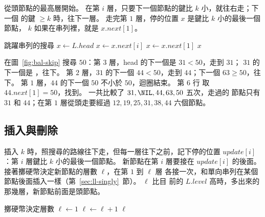 從頭節點的最高層開始。 在第 $i$ 層，只要下一個節點的鍵比 $k$ 小，就往右走；下一個
的鍵 $\ge k$ 時，往下一層。 走完第 $1$ 層，停的位置 $x$ 是鍵比 $k$ 小的最後一個節點，
$k$ 如果在串列裡，就是 $x.\mathit{next}[1]$。

\begin{pseudo}[unbreakable, label=alg:bal-skip-search]{跳躍串列的搜尋}
    \State $x \gets L.\mathit{head}$
         
            \State $x \gets x.\mathit{next}[i]$
        \EndWhile
    \EndFor
    \State $x \gets x.\mathit{next}[1]$
        \State \Return $x$
    \EndIf
    \State \Return \NIL
\EndFunction
\end{pseudo}

在圖~\ref{fig:bal-skip} 搜尋 $50$：第 $3$ 層，head 的下一個是 $31 < 50$，走到 $31$；
$31$ 的下一個是 \NIL，往下。 第 $2$ 層，$31$ 的下一個 $44 < 50$，走到 $44$；下一個
$63 \ge 50$，往下。 第 $1$ 層，$44$ 的下一個 $50$ 不小於 $50$，迴圈結束。 第 6 行
取 $44.\mathit{next}[1] = 50$，找到。 一共比較了 $31, \NIL, 44, 63, 50$ 五次，走過的
節點只有 $31$ 和 $44$；在第 $1$ 層從頭走要經過 $12, 19, 25, 31, 38, 44$ 六個節點。

\subsection{插入與刪除}
\label{sec:bal-skip-ops}

插入 $k$ 時，照搜尋的路線往下走，但每一層往下之前，記下停的位置
$\mathit{update}[i]$：第 $i$ 層鍵比 $k$ 小的最後一個節點。 新節點在第 $i$ 層要接在
$\mathit{update}[i]$ 的後面。 接著擲硬幣決定新節點的層數 $\ell$，在第 $1$ 到 $\ell$ 層
各接一次，和單向串列在某個節點後面插入一樣（第~\ref{sec:ll-singly}~節）。 $\ell$ 比目
前的 $L.\mathit{level}$ 高時，多出來的那幾層，新節點前面是頭節點。

\begin{pseudo}[label=alg:bal-skip-level]{擲硬幣決定層數}
    \State $\ell \gets 1$
        \State $\ell \gets \ell + 1$
    \EndWhile
    \State \Return $\ell$
\EndFunction
\end{pseudo}

